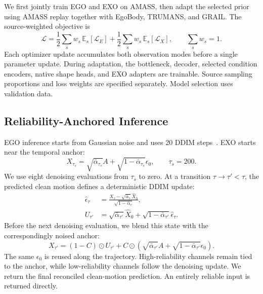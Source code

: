 We first jointly train EGO and EXO on AMASS, then adapt the selected prior using AMASS replay together with EgoBody, TRUMANS, and GRAIL. The source-weighted objective is
\begin{equation}
\mathcal L=
\frac12\sum_s w_s\,\mathbb E_s[\mathcal L_E]
+\frac12\sum_s w_s\,\mathbb E_s[\mathcal L_X],
\qquad \sum_s w_s=1.
\label{eq:joint_loss}
\end{equation}
Each optimizer update accumulates both observation modes before a single parameter update. During adaptation, the bottleneck, decoder, selected condition encoders, native shape heads, and EXO adapters are trainable. Source sampling proportions and loss weights are specified separately. Model selection uses validation data.

\subsection{Reliability-Anchored Inference}
\label{sec:inference}

EGO inference starts from Gaussian noise and uses 20 DDIM steps~\cite{song2021ddim}. EXO starts near the temporal anchor:
\begin{equation}
X_{\tau_s}=\sqrt{\bar\alpha_{\tau_s}}A+
\sqrt{1-\bar\alpha_{\tau_s}}\epsilon_0,\qquad \tau_s=200.
\label{eq:initialization}
\end{equation}
We use eight denoising evaluations from $\tau_s$ to zero. At a transition $\tau\to\tau'<\tau$, the predicted clean motion defines a deterministic DDIM update:
\begin{equation}
\begin{aligned}
\widehat\epsilon_\tau&=
\frac{X_\tau-\sqrt{\bar\alpha_\tau}\widehat X_0}
{\sqrt{1-\bar\alpha_\tau}},\\
U_{\tau'}&=\sqrt{\bar\alpha_{\tau'}}\widehat X_0+
\sqrt{1-\bar\alpha_{\tau'}}\widehat\epsilon_\tau .
\end{aligned}
\label{eq:ddim}
\end{equation}
Before the next denoising evaluation, we blend this state with the correspondingly noised anchor:
\begin{equation}
X_{\tau'}=(1-C)\odot U_{\tau'}+
C\odot\left(
\sqrt{\bar\alpha_{\tau'}}A+
\sqrt{1-\bar\alpha_{\tau'}}\epsilon_0
\right).
\label{eq:anchor_sampling}
\end{equation}
The same $\epsilon_0$ is reused along the trajectory. High-reliability channels remain tied to the anchor, while low-reliability channels follow the denoising update. We return the final reconciled clean-motion prediction. An entirely reliable input is returned directly.

